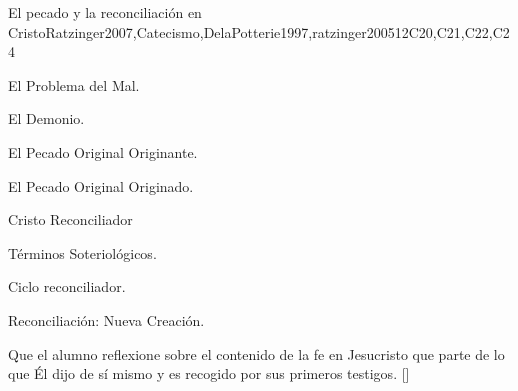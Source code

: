 \begin{syllabus}
\begin{unit}{}{El pecado y la reconciliación en Cristo}{Ratzinger2007,Catecismo,DelaPotterie1997,ratzinger2005}{12}{C20,C21,C22,C24}
\begin{topics}
	\item El Problema del Mal.
	    \begin{subtopics}
		\item El Demonio.
		\item El Pecado Original Originante.
		\item El Pecado Original Originado.
	    \end{subtopics}
	\item Cristo Reconciliador
	      \begin{subtopics}
		\item Términos Soteriológicos.
		\item Ciclo reconciliador.
		\item Reconciliación: Nueva Creación.
	      \end{subtopics}
\end{topics}
\begin{learningoutcomes}
	\item Que el alumno reflexione sobre el contenido de la fe en Jesucristo que parte de lo que Él dijo de sí­ mismo y es recogido por sus primeros testigos. [\Familiarity]
\end{learningoutcomes}
\end{unit}


\end{syllabus}
